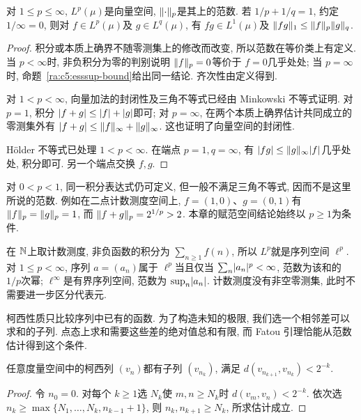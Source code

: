 \begin{proposition}\label{ra:c5:lp-norm}
对 $1\le p\le\infty$, $L^p(\mu)$是向量空间, $\lVert \cdot\rVert_p$是其上的范数. 若 $1/p+1/q=1$, 约定 $1/\infty=0$, 则对 $f\in L^p(\mu)$及 $g\in L^q(\mu)$, 有 $fg\in L^1(\mu)$及 $\lVert fg\rVert_1\le\lVert f\rVert_p\lVert g\rVert_q$.
\end{proposition}
\begin{proof}
积分或本质上确界不随零测集上的修改而改变, 所以范数在等价类上有定义. 当 $p<\infty$时, 非负积分为零的判别说明 $\lVert f\rVert_p=0$等价于 $f=0$几乎处处; 当 $p=\infty$时, 命题~\ref{ra:c5:esssup-bound}给出同一结论. 齐次性由定义得到.

对 $1<p<\infty$, 向量加法的封闭性及三角不等式已经由 Minkowski 不等式证明. 对 $p=1$, 积分 $\lvert f+g\rvert\le\lvert f\rvert+\lvert g\rvert$即可; 对 $p=\infty$, 在两个本质上确界估计共同成立的零测集外有 $\lvert f+g\rvert\le\lVert f\rVert_\infty+\lVert g\rVert_\infty$. 这也证明了向量空间的封闭性.

Hölder 不等式已处理 $1<p<\infty$. 在端点 $p=1,q=\infty$, 有 $\lvert fg\rvert\le\lVert g\rVert_\infty\lvert f\rvert$几乎处处, 积分即可. 另一个端点交换 $f,g$.
\end{proof}

\begin{remark}
对 $0<p<1$, 同一积分表达式仍可定义, 但一般不满足三角不等式, 因而不是这里所说的范数. 例如在二点计数测度空间上, $f=(1,0)$、$g=(0,1)$有 $\lVert f\rVert_p=\lVert g\rVert_p=1$, 而 $\lVert f+g\rVert_p=2^{1/p}>2$. 本章的赋范空间结论始终以 $p\ge1$为条件.
\end{remark}

\begin{example}
在 $\mathbb N$上取计数测度, 非负函数的积分为 $\sum_{n\ge1}f(n)$, 所以 $L^p$就是序列空间 $\ell^p$. 对 $1\le p<\infty$, 序列 $a=(a_n)$属于 $\ell^p$当且仅当 $\sum_n\lvert a_n\rvert^p<\infty$, 范数为该和的 $1/p$次幂; $\ell^\infty$是有界序列空间, 范数为 $\sup_n\lvert a_n\rvert$. 计数测度没有非空零测集, 此时不需要进一步区分代表元.
\end{example}


柯西性质只比较序列中已有的函数. 为了构造未知的极限, 我们选一个相邻差可以求和的子列. 点态上求和需要这些差的绝对值总和有限, 而 Fatou 引理恰能从范数估计得到这个条件.

\begin{lemma}\label{ra:c5:cauchy-subsequence}
任意度量空间中的柯西列 $(v_n)$都有子列 $(v_{n_k})$, 满足 $d(v_{n_{k+1}},v_{n_k})<2^{-k}$.
\end{lemma}
\begin{proof}
令 $n_0=0$. 对每个 $k\ge1$选 $N_k$使 $m,n\ge N_k$时 $d(v_m,v_n)<2^{-k}$. 依次选 $n_k\ge\max\{N_1,\ldots,N_k,n_{k-1}+1\}$, 则 $n_k,n_{k+1}\ge N_k$, 所求估计成立.
\end{proof}

